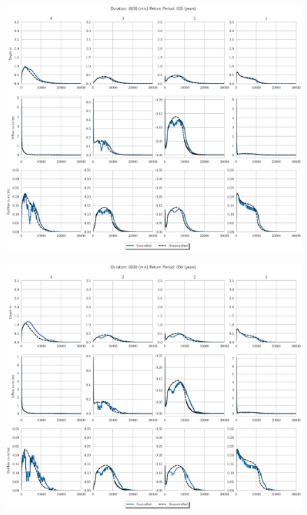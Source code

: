 \begin{figure}
    \centering
    \includegraphics[width=\linewidth]{./RL-SI-figures/77storms/0030025.eps}
\end{figure}
\begin{figure}
    \centering
    \includegraphics[width=\linewidth]{./RL-SI-figures/77storms/0030050.eps}
\end{figure}
